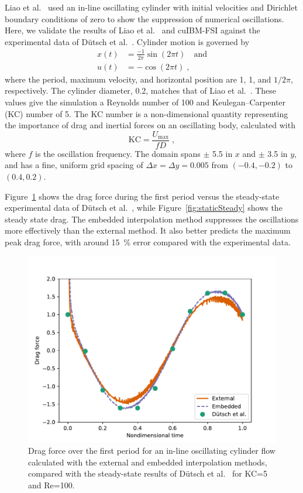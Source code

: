 \documentclass[preprint,12pt]{elsarticle}
\begin{document}
Liao et al.~\cite{liao2010simulating} used an in-line oscillating cylinder with initial velocities
and Dirichlet boundary conditions of zero to show the suppression of numerical oscillations.
Here, we validate the results of Liao et al.~\cite{liao2010simulating} and cuIBM-FSI
against the experimental data of D\"{u}tsch et al.~\cite{dutsch1998low}.
Cylinder motion is governed by
\begin{align}
x(t) &= \frac{-1}{2\pi} \sin(2\pi t) \quad \text{and} \label{eq:cylinder position2}\\
u(t) &= -\cos(2\pi t) \;, \label{eq:cylinder velocity2}
\end{align}
where the period, maximum velocity, and horizontal position are 1, 1, and $1/2\pi$, respectively.
The cylinder diameter, 0.2, matches that of Liao et al.~\cite{liao2010simulating}.
These values give the simulation a Reynolds number of 100 and Keulegan--Carpenter (KC) number of 5.
The KC number is a non-dimensional quantity representing the importance of drag and
inertial forces on an oscillating body, calculated with
\begin{equation}
\text{KC} = \frac{U_\text{max}}{fD} \label{eq:KC} \;,
\end{equation}
where $f$ is the oscillation frequency.
The domain spans $\pm$ 5.5 in $x$ and $\pm$ 3.5 in $y$, and has a fine, uniform grid
spacing of $\Delta x = \Delta y = 0.005$ from $(-0.4,-0.2)$ to $(0.4,0.2)$.


Figure~\ref{fig:staticInit} shows the drag force during the first period versus the
steady-state experimental data of D\"{u}tsch et al.~\cite{dutsch1998low}, while
Figure~\ref{fig:staticSteady} shows the steady state drag.
The embedded interpolation method suppresses the oscillations more effectively than the external method.
It also better predicts the maximum peak drag force, with around \SI{15}{\percent}
error compared with the experimental data.

\begin{figure}[htbp]
    \centering
    \includegraphics[width=0.75\linewidth]{static_init.pdf}
    \caption{Drag force over the first period for an in-line oscillating cylinder flow
    calculated with the external and embedded interpolation methods, compared with the
    steady-state results of D\"{u}tsch et al.~\cite{dutsch1998low} for KC=5 and Re=100.
    }
    \label{fig:staticInit}
\end{figure}
\end{document}
